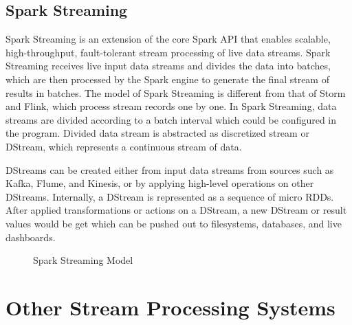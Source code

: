 \subsection{Spark Streaming}

Spark Streaming is an extension of the core Spark API that enables scalable, high-throughput, fault-tolerant stream processing of live data streams. Spark Streaming receives live input data streams and divides the data into batches, which are then processed by the Spark engine to generate the final stream of results in batches. The model of Spark Streaming is different from that of Storm and Flink, which process stream records one by one. In Spark Streaming, data streams are divided according to a batch interval which could be configured in the program. Divided data stream is abstracted as discretized stream or DStream, which represents a continuous stream of data. 

DStreams can be created either from input data streams from sources such as Kafka, Flume, and Kinesis, or by applying high-level operations on other DStreams. Internally, a DStream is represented as a sequence of micro RDDs. After applied transformations or actions on a DStream, a new DStream or result values would be get which can be pushed out to filesystems, databases, and live dashboards.

\begin{figure}
  \begin{center}
   \caption{Spark Streaming Model}
   \label{fig:spark_stream}
  \end{center}
\end{figure}

\section{Other Stream Processing Systems}
